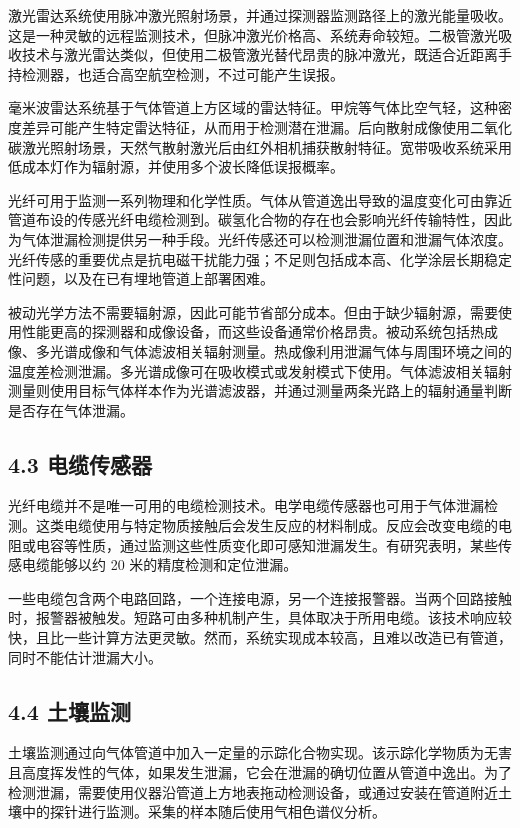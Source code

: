 激光雷达系统使用脉冲激光照射场景，并通过探测器监测路径上的激光能量吸收。这是一种灵敏的远程监测技术，但脉冲激光价格高、系统寿命较短。二极管激光吸收技术与激光雷达类似，但使用二极管激光替代昂贵的脉冲激光，既适合近距离手持检测器，也适合高空航空检测，不过可能产生误报。

毫米波雷达系统基于气体管道上方区域的雷达特征。甲烷等气体比空气轻，这种密度差异可能产生特定雷达特征，从而用于检测潜在泄漏。后向散射成像使用二氧化碳激光照射场景，天然气散射激光后由红外相机捕获散射特征。宽带吸收系统采用低成本灯作为辐射源，并使用多个波长降低误报概率。

光纤可用于监测一系列物理和化学性质。气体从管道逸出导致的温度变化可由靠近管道布设的传感光纤电缆检测到。碳氢化合物的存在也会影响光纤传输特性，因此为气体泄漏检测提供另一种手段。光纤传感还可以检测泄漏位置和泄漏气体浓度。光纤传感的重要优点是抗电磁干扰能力强；不足则包括成本高、化学涂层长期稳定性问题，以及在已有埋地管道上部署困难。

被动光学方法不需要辐射源，因此可能节省部分成本。但由于缺少辐射源，需要使用性能更高的探测器和成像设备，而这些设备通常价格昂贵。被动系统包括热成像、多光谱成像和气体滤波相关辐射测量。热成像利用泄漏气体与周围环境之间的温度差检测泄漏。多光谱成像可在吸收模式或发射模式下使用。气体滤波相关辐射测量则使用目标气体样本作为光谱滤波器，并通过测量两条光路上的辐射通量判断是否存在气体泄漏。

\subsection*{4.3 电缆传感器}

光纤电缆并不是唯一可用的电缆检测技术。电学电缆传感器也可用于气体泄漏检测。这类电缆使用与特定物质接触后会发生反应的材料制成。反应会改变电缆的电阻或电容等性质，通过监测这些性质变化即可感知泄漏发生。有研究表明，某些传感电缆能够以约 20 米的精度检测和定位泄漏。

一些电缆包含两个电路回路，一个连接电源，另一个连接报警器。当两个回路接触时，报警器被触发。短路可由多种机制产生，具体取决于所用电缆。该技术响应较快，且比一些计算方法更灵敏。然而，系统实现成本较高，且难以改造已有管道，同时不能估计泄漏大小。

\subsection*{4.4 土壤监测}

土壤监测通过向气体管道中加入一定量的示踪化合物实现。该示踪化学物质为无害且高度挥发性的气体，如果发生泄漏，它会在泄漏的确切位置从管道中逸出。为了检测泄漏，需要使用仪器沿管道上方地表拖动检测设备，或通过安装在管道附近土壤中的探针进行监测。采集的样本随后使用气相色谱仪分析。

